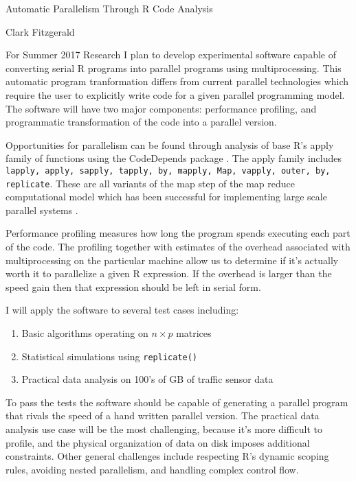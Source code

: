 \documentclass[12pt]{article}
\begin{document}
\begin{center}
    \large Automatic Parallelism Through R Code Analysis 

    \normalsize Clark Fitzgerald
\end{center}

\hfill

For Summer 2017 Research I plan to develop experimental software capable of
converting serial R programs into parallel programs using multiprocessing.
This automatic program tranformation differs from current parallel
technologies which require the user to explicitly write code for a given
parallel programming model. The software will have two major components:
performance profiling, and programmatic transformation of the code into a
parallel version.


Opportunities for parallelism can be found through analysis of base R's
apply family of functions using the CodeDepends package
\cite{R-CodeDepends}. The apply family includes \texttt{lapply, apply, sapply,
tapply, by, mapply, Map, vapply, outer, by, replicate}. These are all
variants of the map step of the map reduce computational model which has
been successful for implementing large scale parallel systems
\cite{dean2008mapreduce}. 

Performance profiling measures how long the program spends executing each
part of the code. The profiling together with estimates of the overhead
associated with multiprocessing on the particular machine allow us to
determine if it's actually worth it to parallelize a given R expression.
If the overhead is larger than the speed gain then that expression should
be left in serial form.

I will apply the software to several test cases including:
\begin{enumerate}
    \item Basic algorithms operating on $n \times p$ matrices
    \item Statistical simulations using \texttt{replicate()}
    \item Practical data analysis on 100's of GB of traffic sensor data 
\end{enumerate}
To pass the tests the software should be capable of generating a parallel
program that rivals the speed of a hand written parallel version. The
practical data analysis use case will be the most challenging, because it's
more difficult to profile, and the physical organization of data on disk
imposes additional constraints.
Other general challenges include respecting R's dynamic scoping rules,
avoiding nested parallelism, and handling complex control flow.
\end{document}
